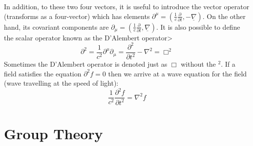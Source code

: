 \vspace{2mm}\noindent In addition, to these two four vectors, it is useful to introduce the vector operator (transforms as a four-vector) which has elements $\partial^\mu = (\frac{1}{c}\frac{\partial}{\partial t}, -\underline\nabla)$. On the other hand, its covariant components are $\partial_\mu = (\frac{1}{c}\frac{\partial}{\partial t}, \underline \nabla)$. It is also possible to define the scalar operator known as the D'Alembert operator>
\begin{equation}
    \partial^2 = \frac{1}{c^2}\partial^\mu \partial_\mu = \frac{\partial^2}{\partial t^2} - \nabla^2  = \Box^2
\end{equation}
Sometimes the D'Alembert operator is denoted just as $\Box$ without the $^2$. If a field satisfies the equation $\partial^2 f =0$ then we arrive at a wave equation for the field (wave travelling at the speed of light):
\begin{equation}
    \frac{1}{c^2}\frac{\partial^2 f}{\partial t^2} = \nabla^2 f
\end{equation}
\section{Group Theory}
